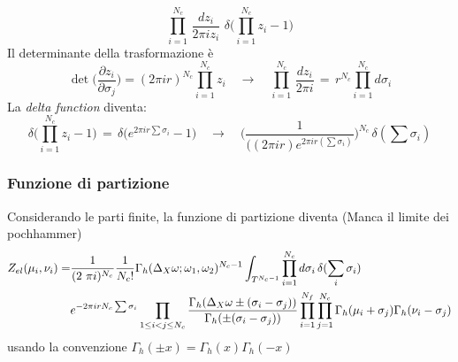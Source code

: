 \documentclass[a4paper,12pt]{article}
\begin{document}
$$
\prod_{i=1}^{N_c} \, \frac{dz_i}{2 \pi i z_i} \, \, \delta \big( \prod_{i=1}^{N_c} z_i - 1 \big)
$$ 
Il determinante della trasformazione è
$$
  \det \big (\frac{ \partial z_i }{ \partial \sigma_j})= (2 \pi i r)^{N_c} \prod_{i=1}^{N_c}  z_i \quad \longrightarrow \quad \prod_{i=1}^{N_c} \, \frac{dz_i}{2 \pi i} \, = \, r^{N_c} \prod_{i=1}^{N_c} d \sigma_i
$$
La \emph{delta function} diventa:
\begin{equation}
\delta \big( \prod_{i=1}^{N_c} z_i - 1 \big) \, = \, \delta \big(e^{2 \pi i r \sum \sigma_i} - 1 \big) \quad \longrightarrow \quad  \bigg( \frac{1}{ ((2 \pi i r) e^{2 \pi i r (\sum \sigma_i)}} \bigg)^{N_c} \, \delta ( \sum \sigma_i)
 \end{equation}
\begin{comment}
		 Si può capire il risultato della delta function come un ulteriore cambio di variabile fra le $\sigma_i$:
 	\begin{align*}
 	 \sigma_i \rightarrow \tilde{\sigma_i} \qquad \mbox{per} \qquad i= 1 \ldots N-1 \qquad \sigma_N \rightarrow \tilde{\sigma_N} = S = \sum_{i=1}^{N} \sigma_i \\
 	  Det(J) = Det \bigg( \frac{\partial \sigma_i}{\partial \tilde{\sigma_j} } \bigg) \; = \; 
 	   \begin{pmatrix}[c c c  c|c]
			1 	& 0 		& 0 & \cdots & 0 \\
			0 			 & 1 & 0 & \cdots &  \vdots \\
			\vdots 		& 0 		& \ddots & 0 & \vdots \\
			\vdots & \vdots & 0 & 1 & 0 \\
			\hline 
			1 & \cdots & \cdots & 1  &1 \\
	\end{pmatrix} 
	\end{align*}
\end{comment}

\subsubsection{Funzione di partizione}
Considerando le parti finite, la funzione di partizione diventa
(Manca il limite dei pochhammer)
\begin{align*}
Z_{el} ( \mu_i , \nu_i ) = &
 \frac{1}{ (2 \ \pi i)^{N_c} }{1 \over N_c ! } 
\Gamma_h ( \Delta_X \omega ; \omega_1 , \omega_2)^{N_c-1}
\int_{T^{N_c-1}}  
\prod_{i=1}^{N_c} d \sigma_i \, \delta( \sum_i \sigma_i) \, \\
 & e^{- 2 \pi i r N_c \sum \sigma_i} 
 \prod_{ 1 \leq i<j \leq N_c} \frac{ \Gamma_h( \Delta_X \omega \pm (\sigma_i - \sigma_j)) }{ \Gamma_h ( \pm (\sigma_i - \sigma_j) )} 
 \prod_{i=1}^{N_f} \prod_{j=1}^{N_c} \Gamma_h ( \mu_i + \sigma_j) \Gamma_h ( \nu_i - \sigma_j)
\end{align*}
usando la convenzione $ \Gamma_h ( \pm x ) = \Gamma_h (x) \Gamma_h( -x)$
\end{document}
